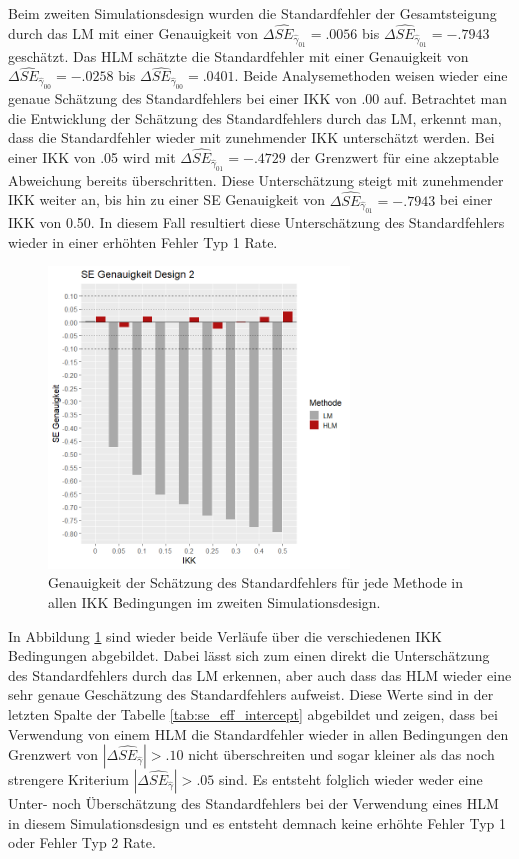 \documentclass[12pt]{article}\usepackage[]{graphicx}\usepackage[]{color}
\begin{document}
Beim zweiten Simulationsdesign wurden die Standardfehler der Gesamtsteigung durch das LM mit einer Genauigkeit von $\Delta\widehat{SE}_{\widehat{\gamma}_{01}} = .0056$ bis $\Delta\widehat{SE}_{\widehat{\gamma}_{01}} = -.7943$ geschätzt. Das HLM schätzte die Standardfehler mit einer Genauigkeit von $\Delta\widehat{SE}_{\widehat{\gamma}_{00}} = -.0258$ bis $\Delta\widehat{SE}_{\widehat{\gamma}_{00}} = .0401$. Beide Analysemethoden weisen wieder eine genaue Schätzung des Standardfehlers bei einer IKK von .00 auf. Betrachtet man die Entwicklung der Schätzung des Standardfehlers durch das LM, erkennt man, dass die Standardfehler wieder mit zunehmender IKK unterschätzt werden. Bei einer IKK von .05 wird mit $\Delta\widehat{SE}_{\widehat{\gamma}_{01}} = -.4729$ der Grenzwert für eine akzeptable Abweichung bereits überschritten. Diese Unterschätzung steigt mit zunehmender IKK weiter an, bis hin zu einer SE Genauigkeit von $\Delta\widehat{SE}_{\widehat{\gamma}_{01}} = -.7943$ bei einer IKK von 0.50. In diesem Fall resultiert diese Unterschätzung des Standardfehlers wieder in einer erhöhten Fehler Typ 1 Rate.
\begin{figure}[t!]
\centering
\captionsetup{width=8cm}
\includegraphics[width=8cm, height=8cm]{se_genauigkeit_design2}
\caption{Genauigkeit der Schätzung des Standardfehlers für jede Methode in allen IKK Bedingungen im zweiten Simulationsdesign.}
\label{fig:se_genauigkeit_design2}
\end{figure}
In Abbildung \ref{fig:se_genauigkeit_design2} sind wieder beide Verläufe über die verschiedenen IKK Bedingungen abgebildet. Dabei lässt sich zum einen direkt die Unterschätzung des Standardfehlers durch das LM erkennen, aber auch dass das HLM wieder eine sehr genaue Geschätzung des Standardfehlers aufweist. Diese Werte sind in der letzten Spalte der Tabelle \ref{tab:se_eff_intercept} abgebildet und zeigen, dass bei Verwendung von einem HLM die Standardfehler wieder in allen Bedingungen den Grenzwert von $|\Delta\widehat{SE}_{\widehat{\gamma}}| > .10$ nicht überschreiten und sogar kleiner als das noch strengere Kriterium $|\Delta\widehat{SE}_{\widehat{\gamma}}| > .05$ sind. Es entsteht folglich wieder weder eine Unter- noch Überschätzung des Standardfehlers bei der Verwendung eines HLM in diesem Simulationsdesign und es entsteht demnach keine erhöhte Fehler Typ 1 oder Fehler Typ 2 Rate.
\end{document}
